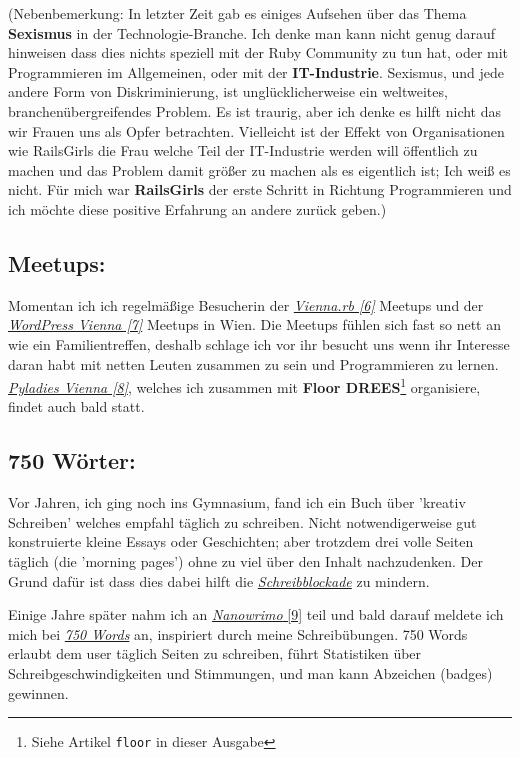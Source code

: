 \documentclass[10pt,a4paper,ngerman,twoside]{article} %
\begin{document}
\begin{multicols}{3}
(Nebenbemerkung: In letzter Zeit gab es einiges Aufsehen über das Thema \textbf{Sexismus} in der Technologie-Branche. Ich denke man kann nicht genug darauf hinweisen dass dies nichts speziell mit der Ruby Community zu tun hat, oder mit Programmieren im Allgemeinen, oder mit der \textbf{IT-Industrie}. Sexismus, und jede andere Form von Diskriminierung, ist unglücklicherweise ein weltweites, branchenübergreifendes Problem. Es ist traurig, aber ich denke es hilft nicht das wir Frauen uns als Opfer betrachten. Vielleicht ist der Effekt von Organisationen wie RailsGirls die Frau welche Teil der IT-Industrie werden will öffentlich zu machen und das Problem damit größer zu machen als es eigentlich ist; Ich weiß es nicht. Für mich war \textbf{RailsGirls} der erste Schritt in Richtung Programmieren und ich möchte diese positive Erfahrung an andere zurück geben.)

\subsection*{Meetups:}

Momentan ich ich regelmäßige Besucherin der \href{http://vienna.rb}{\textit{Vienna.rb [6]}} Meetups und der \href{http://wpvienna.com/}{\textit{WordPress Vienna [7]}} Meetups in Wien. Die Meetups fühlen sich fast so nett an wie ein Familientreffen, deshalb schlage ich vor ihr besucht uns wenn ihr Interesse daran habt mit netten Leuten zusammen zu sein und Programmieren zu lernen. \href{http://meetup.com/pyladies-vienna}{\textit{Pyladies Vienna [8]}}, welches ich zusammen mit \textbf{Floor DREES}\footnote{Siehe Artikel \texttt{floor} in dieser Ausgabe} organisiere, findet auch bald statt. 

\subsection*{750 Wörter:}

Vor Jahren, ich ging noch ins Gymnasium, fand ich ein Buch über 'kreativ Schreiben' welches empfahl täglich zu schreiben. Nicht notwendigerweise gut konstruierte kleine Essays oder Geschichten; aber trotzdem drei volle Seiten täglich (die 'morning pages') ohne zu viel über den Inhalt nachzudenken. Der Grund dafür ist dass dies dabei hilft die \href{https://de.wikipedia.org/wiki/Schreibblockade}{\textit{Schreibblockade}} zu mindern. 

Einige Jahre später nahm ich an \href{http://nanowrimo.org/}{\textit{Nanowrimo} [9]} teil und bald darauf meldete ich mich bei \href{https://750words.com/}{\textit{750 Words}} an, inspiriert durch meine Schreibübungen. 750 Words erlaubt dem user täglich Seiten zu schreiben, führt Statistiken über Schreibgeschwindigkeiten und Stimmungen, und man kann Abzeichen (badges) gewinnen. 


\end{multicols}
\end{document}
